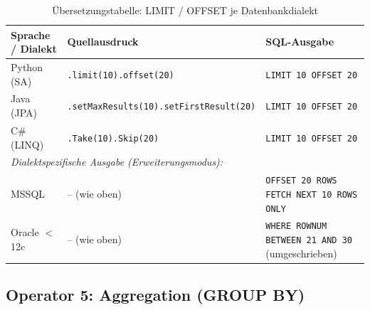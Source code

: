 \begin{table}
\centering
\caption{Übersetzungstabelle: LIMIT / OFFSET je Datenbankdialekt}
\label{tab:limit_ops}
\renewcommand{\arraystretch}{1.4}
\begin{tabularx}{\textwidth}{lXX}
\toprule
\textbf{Sprache / Dialekt} & \textbf{Quellausdruck} & \textbf{SQL-Ausgabe} \\
\midrule
Python (SA)
  & \texttt{.limit(10).offset(20)}
  & \texttt{LIMIT 10 OFFSET 20} \\
Java (JPA)
  & \texttt{.setMaxResults(10).setFirstResult(20)}
  & \texttt{LIMIT 10 OFFSET 20} \\
C\# (LINQ)
  & \texttt{.Take(10).Skip(20)}
  & \texttt{LIMIT 10 OFFSET 20} \\
\midrule
\multicolumn{3}{l}{\textit{Dialektspezifische Ausgabe (Erweiterungsmodus):}} \\
MSSQL
  & -- (wie oben)
  & \texttt{OFFSET 20 ROWS FETCH NEXT 10 ROWS ONLY} \\
Oracle $<$12c
  & -- (wie oben)
  & \texttt{WHERE ROWNUM BETWEEN 21 AND 30} (umgeschrieben) \\
\bottomrule
\end{tabularx}
\end{table}

\subsection{Operator 5: Aggregation (GROUP BY)}
\label{subsec:op_agg}

